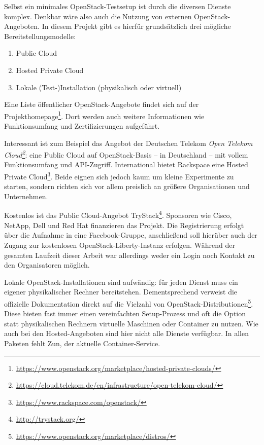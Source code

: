 Selbst ein minimales OpenStack-Testsetup ist durch die diversen Dienste komplex. Denkbar wäre also auch die Nutzung von externen OpenStack-Angeboten. In diesem Projekt gibt es hierfür grundsätzlich drei mögliche Bereitstellungsmodelle:

\begin{enumerate}
	\item Public Cloud
	\item Hosted Private Cloud
	\item Lokale (Test-)Installation (physikalisch oder virtuell)
\end{enumerate}

\noindent Eine Liste öffentlicher OpenStack-Angebote findet sich auf der Projekthomepage\footnote{\url{https://www.openstack.org/marketplace/hosted-private-clouds/}}. Dort werden auch weitere Informationen wie Funktionsumfang und Zertifizierungen aufgeführt. 

Interessant ist zum Beispiel das Angebot der Deutschen Telekom \emph{Open Telekom Cloud\footnote{\url{https://cloud.telekom.de/en/infrastructure/open-telekom-cloud/}}}: eine Public Cloud auf OpenStack-Basis -- in Deutschland -- mit vollem Funktionsumfang und API-Zugriff. International bietet Rackspace eine Hosted Private Cloud\footnote{\url{https://www.rackspace.com/openstack/}}. Beide eignen sich jedoch kaum um kleine Experimente zu starten, sondern richten sich vor allem preislich an größere Organisationen und Unternehmen.

Kostenlos ist das Public Cloud-Angebot TryStack\footnote{\url{http://trystack.org/}}. Sponsoren wie Cisco, \mbox{NetApp}, Dell und Red Hat finanzieren das Projekt. Die Registrierung erfolgt über die Aufnahme in eine Facebook-Gruppe, anschließend soll hierüber auch der Zugang zur kostenlosen OpenStack-Liberty-Instanz erfolgen. Während der gesamten Laufzeit dieser Arbeit war allerdings weder ein Login noch Kontakt zu den Organisatoren möglich.

Lokale OpenStack-Installationen sind aufwändig: für jeden Dienst muss ein eigener physikalischer Rechner bereitstehen. Dementsprechend verweist die offizielle Dokumentation direkt auf die Vielzahl von OpenStack-Distributionen\footnote{\url{https://www.openstack.org/marketplace/distros/}}. Diese bieten fast immer einen vereinfachten Setup-Prozess und oft die Option statt physikalischen Rechnern virtuelle Maschinen oder Container zu nutzen. Wie auch bei den Hosted-Angeboten sind hier nicht alle Dienste verfügbar. In allen Paketen fehlt Zun, der aktuelle Container-Service.

